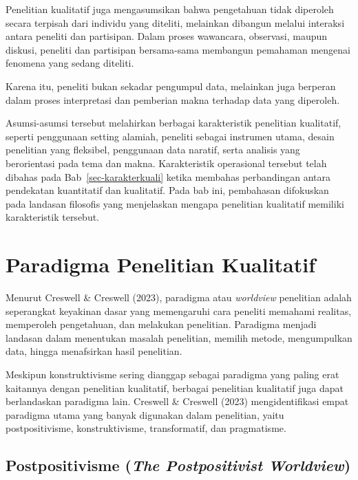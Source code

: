 \documentclass[
  indonesian,
  letterpaper,
  DIV=11,
  numbers=noendperiod]{scrreprt}
\begin{document}
\begin{itemize}
  Penelitian kualitatif juga mengasumsikan bahwa pengetahuan tidak
  diperoleh secara terpisah dari individu yang diteliti, melainkan
  dibangun melalui interaksi antara peneliti dan partisipan. Dalam
  proses wawancara, observasi, maupun diskusi, peneliti dan partisipan
  bersama-sama membangun pemahaman mengenai fenomena yang sedang
  diteliti.

  Karena itu, peneliti bukan sekadar pengumpul data, melainkan juga
  berperan dalam proses interpretasi dan pemberian makna terhadap data
  yang diperoleh.
\end{itemize}

Asumsi-asumsi tersebut melahirkan berbagai karakteristik penelitian
kualitatif, seperti penggunaan setting alamiah, peneliti sebagai
instrumen utama, desain penelitian yang fleksibel, penggunaan data
naratif, serta analisis yang berorientasi pada tema dan makna.
Karakteristik operasional tersebut telah dibahas pada
Bab~\ref{sec-karakterkuali} ketika membahas perbandingan antara
pendekatan kuantitatif dan kualitatif. Pada bab ini, pembahasan
difokuskan pada landasan filosofis yang menjelaskan mengapa penelitian
kualitatif memiliki karakteristik tersebut.

\section{Paradigma Penelitian
Kualitatif}\label{paradigma-penelitian-kualitatif}

Menurut Creswell \& Creswell (2023), paradigma atau \emph{worldview}
penelitian adalah seperangkat keyakinan dasar yang memengaruhi cara
peneliti memahami realitas, memperoleh pengetahuan, dan melakukan
penelitian. Paradigma menjadi landasan dalam menentukan masalah
penelitian, memilih metode, mengumpulkan data, hingga menafsirkan hasil
penelitian.

Meskipun konstruktivisme sering dianggap sebagai paradigma yang paling
erat kaitannya dengan penelitian kualitatif, berbagai penelitian
kualitatif juga dapat berlandaskan paradigma lain. Creswell \& Creswell
(2023) mengidentifikasi empat paradigma utama yang banyak digunakan
dalam penelitian, yaitu postpositivisme, konstruktivisme, transformatif,
dan pragmatisme.

\subsection{\texorpdfstring{Postpositivisme (\emph{The Postpositivist
Worldview})}{Postpositivisme (The Postpositivist Worldview)}}\label{postpositivisme-the-postpositivist-worldview}
\end{document}
